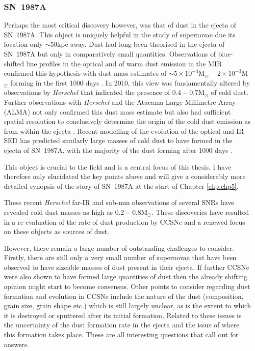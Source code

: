  \subsubsection{SN~1987A}
 
 Perhaps the most critical discovery however, was that of dust in the ejecta of SN~1987A.  This object is uniquely helpful in the study of supernovae due its location only $\sim$50kpc away.  Dust had long been theorised in the ejecta of SN~1987A but only in comparatively small quantities.  Observations of blue-shifted line profiles in the optical and of warm dust emission in the MIR confirmed this hypothesis with dust mass estimates of $\sim5\times 10^{-4}$M$_{\odot} - 2 \times 10^{-3}$M$_{\odot}$ forming in the first 1000 days \citep{Lucy1989,Roche1989,Bouchet1991,Wooden1993,Ercolano2007}.  In 2010, this view was fundamentally altered by observations by \textit{Herschel} that indicated the presence of $0.4-0.7$M$_{\odot}$ of cold dust.  Further observations with {\em Herschel} and the Atacama Large Millimetre Array (ALMA) not only confirmed this dust mass estimate but also had sufficient spatial resolution to conclusively determine the origin of the cold dust emission as from within the ejecta \citep{Matsuura2011,Indebetouw2014,Matsuura2015}.  Recent modelling of the evolution of the optical and IR SED has predicted similarly large  masses of cold dust to  have formed in the ejecta of SN~1987A, with the majority of the dust forming after 1000 days \citep{Wesson2015}.
 
 This object is crucial to the field and is a central focus of this thesis.  I have therefore only elucidated the key points above and will give a considerably more detailed synopsis of the story of SN~1987A at the start of Chapter \ref{chp:chp5}.
 
\vspace{3ex}
\noindent These recent {\em Herschel} far-IR and sub-mm observations of several SNRs have revealed cold dust masses as high as $0.2-0.8$M$_{\odot}$.  These discoveries have resulted in a re-evaluation of the rate of dust production by CCSNe and a renewed focus on these objects as sources of dust.

However, there remain a large number of outstanding challenges to consider.  Firstly, there are still only a very small number of supernovae that have been observed to have sizeable masses of dust present in their ejecta.  If further CCSNe were also shown to have formed large quantities of dust then the already shifting opinion might start to become consensus.  Other points to consider regarding dust formation and evolution in CCSNe include the nature of the dust (composition, grain size, grain shape etc.) which is still largely unclear, as is the extent to which it is destroyed or sputtered after its initial formation.  Related to these issues is the uncertainty of the dust formation rate in the ejecta and the issue of where this formation takes place.  These are all interesting questions that call out for answers.  

